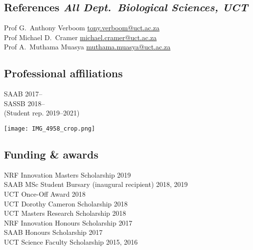 \documentclass[10pt]{article}
\begin{document}
\begin{multicols}{2}
\subsection*{References %
           \hfill {\small \textmd{\textit{All Dept.~Biological Sciences, UCT}}}}

Prof G.~Anthony Verboom
      \hfill     \href{mailto:tony.verboom@uct.ac.za}{tony.verboom@uct.ac.za} \\
Prof Michael D.~Cramer
      \hfill \href{mailto:michael.cramer@uct.ac.za}{michael.cramer@uct.ac.za} \\
Prof A.~Muthama Muasya
      \hfill \href{mailto:muthama.muasya@uct.ac.za}{muthama.muasya@uct.ac.za} \\

\begin{multicols}{2}
  \subsection*{\normalsize Professional affiliations} %
  SAAB                       \hfill {\small 2017--\hspace*{2.5em}} \\
  SASSB                      \hfill {\small 2018--\hspace*{2.5em}} \\
  \hspace{1em} (Student rep. \hfill {\small 2019--2021})
  \vfill
  \columnbreak
  \begin{center}
    \texttt{[image: IMG\_4958\_crop.png]}
  \end{center}
\end{multicols}

\subsection*{Funding \& awards} %

NRF Innovation Masters Scholarship                       \hfill {\small 2019} \\
SAAB MSc Student Bursary {\small (inaugural recipient)}
                                                   \hfill {\small 2018, 2019} \\
UCT Once-Off Award                                 \hfill {\small       2018} \\
UCT Dorothy Cameron Scholarship                    \hfill {\small       2018} \\
UCT Masters Research Scholarship                   \hfill {\small       2018} \\
NRF Innovation Honours Scholarship                 \hfill {\small       2017} \\
SAAB Honours Scholarship                           \hfill {\small       2017} \\
UCT Science Faculty Scholarship                    \hfill {\small 2015, 2016}


\end{multicols}
\end{document}
